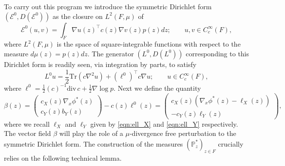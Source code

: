 \documentclass{article}
\theoremstyle{plain}
\theoremstyle{definition}
\renewcommand{\P}{\mathbb{P}}
\newcommand{\Ecal}{{\mathcal E}}
\numberwithin{lem}{section}
\begin{document}
To carry out this program we introduce the symmetric Dirichlet form $(\Ecal^0,D(\Ecal^0))$ as the closure on $L^2(F,\mu)$ of
\[\Ecal^0(u,v) = \int_F \nabla u(z)^\top c(z)\nabla v(z)p(z)dz; \qquad u,v \in C_c^\infty(F),\]
where $L^2(F,\mu)$ is the space of square-integrable functions with respect to the measure $d\mu(z) = p(z)dz$. The generator $(L^0,D(L^0))$ corresponding to this Dirichlet form is readily seen, via integration by parts, to satisfy
\[L^0u  = \frac{1}{2}\mathrm{Tr}(c\nabla^2u) + (\ell^0)^\top c \nabla u; \qquad u \in C_c^\infty(F),\]
where $\ell^0 = \frac{1}{2}(c)^{-1}\mathrm{div} \, c + \frac{1}{2}\nabla \log p$. Next we define the quantity
\[\beta(z) = \begin{pmatrix}c_X(z)\nabla_x \phi^*(z) \\ c_Y(z)b_Y(z) \end{pmatrix} - c(z)\ell^0(z) = \begin{pmatrix}
    c_X(z)(\nabla_x \phi^*(z) - \ell_X(z)) \\ -c_Y(z)\ell_Y(z)
\end{pmatrix},\]
where we recall $\ell_X$ and $\ell_Y$ given by \eqref{eqn:ell_X} and \eqref{eqn:ell_Y} respectively.
The vector field $\beta $ will play the role of a $\mu$-divergence free perturbation to the symmetric Dirichlet form. The construction of the measures $(\P^*_z)_{z \in F}$ crucially relies on the following technical lemma.
\end{document}
